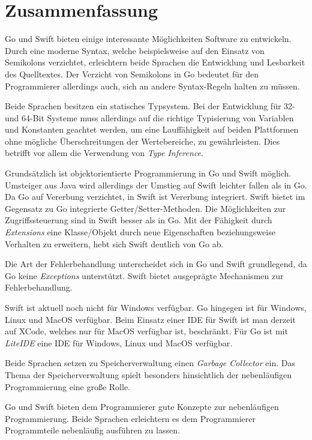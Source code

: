 \chapter{Zusammenfassung}
Go und Swift bieten einige interessante Möglichkeiten Software zu entwickeln.
Durch eine moderne Syntax, welche beispielsweise auf den Einsatz von Semikolons verzichtet,
erleichtern beide Sprachen die Entwicklung und Lesbarkeit des Quelltextes.
Der Verzicht von Semikolons in Go bedeutet für den Programmierer allerdings auch, sich an andere Syntax-Regeln halten zu müssen.

Beide Sprachen besitzen ein statisches Typsystem.
Bei der Entwicklung für 32- und 64-Bit Systeme muss allerdings auf die richtige Typisierung von Variablen und Konstanten geachtet werden, um eine Lauffähigkeit auf beiden Plattformen ohne mögliche Überschreitungen der Wertebereiche, zu gewährleisten.
Dies betrifft vor allem die Verwendung von \textit{Type Inference}.

Grundsätzlich ist objektorientierte Programmierung in Go und Swift möglich.
Umsteiger aus Java wird allerdings der Umstieg auf Swift leichter fallen als in Go.
Da Go auf Vererbung verzichtet, in Swift ist Vererbung integriert.
Swift bietet im Gegensatz zu Go integrierte Getter/Setter-Methoden.
Die Möglichkeiten zur Zugriffssteuerung sind in Swift besser als in Go.
Mit der Fähigkeit durch \textit{Extensions} eine Klasse/Objekt durch neue Eigenschaften beziehungsweise Verhalten zu erweitern, hebt sich Swift deutlich von Go ab.

Die Art der Fehlerbehandlung unterscheidet sich in Go und Swift grundlegend, da Go keine \textit{Exceptions} unterstützt.
Swift bietet ausgeprägte Mechanismen zur Fehlerbehandlung.

Swift ist aktuell noch nicht für Windows verfügbar. 
Go hingegen ist für Windows, Linux und MacOS verfügbar.
Beim Einsatz einer \gls{IDE} für Swift ist man derzeit auf XCode, welches nur für MacOS verfügbar ist, beschränkt.
Für Go ist mit \textit{LiteIDE} eine \gls{IDE} für Windows, Linux und MacOS verfügbar.

Beide Sprachen setzen zu Speicherverwaltung einen \textit{Garbage Collector} ein.
Das Thema der Speicherverwaltung spielt besonders hinsichtlich der nebenläufigen Programmierung eine große Rolle.

Go und Swift bieten dem Programmierer gute Konzepte zur nebenläufigen Programmierung. 
Beide Sprachen erleichtern es dem Programmierer Programmteile nebenläufig ausführen zu lassen. 

